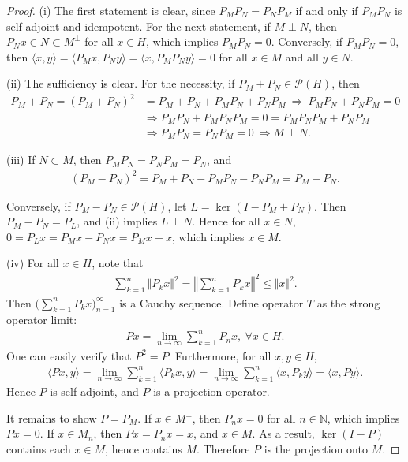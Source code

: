 \documentclass{article}
\begin{document}
\begin{proof}
(i) The first statement is clear, since $P_MP_N=P_NP_M$ if and only if $P_MP_N$ is self-adjoint and idempotent. For the next statement, if $M\perp N$, then $P_N x\in N\subset M^\perp$ for all $x\in H$, which implies $P_MP_N=0$. Conversely, if $P_MP_N=0$, then $\langle x,y\rangle= \langle P_M x,P_N y\rangle = \langle x, P_MP_N y\rangle = 0$ for all $x\in M$ and all $y\in N$.

(ii) The sufficiency is clear. For the necessity, if $P_M+P_N\in\mathcal{P}(H)$, then
\begin{align*}
	P_M+P_N=(P_M+P_N)^2 &= P_M + P_N + P_MP_N + P_NP_M\ \Rightarrow\ P_MP_N+P_NP_M=0\\
	&\Rightarrow P_MP_N + P_MP_NP_M = 0 = P_MP_NP_M+P_NP_M\\
	&\Rightarrow P_MP_N=P_NP_M=0\ \Rightarrow M\perp N.
\end{align*} 

(iii) If $N\subset M$, then $P_MP_N=P_NP_M = P_N$, and
\begin{align*}
	(P_M-P_N)^2 = P_M + P_N - P_MP_N - P_NP_M = P_M-P_N.
\end{align*}

Conversely, if $P_M-P_N\in\mathcal{P}(H)$, let $L=\ker(I-P_M+P_N)$. Then $P_M-P_N=P_L$, and (ii) implies $L\perp N$. Hence for all $x\in N$, $0=P_L x= P_Mx-P_N x = P_M x - x$, which implies $x\in M$.

(iv) For all $x\in H$, note that
\begin{align*}
	\sum_{k=1}^n\Vert P_k x\Vert^2 = \left\Vert\sum_{k=1}^n P_k x\right\Vert^2 \leq\Vert x\Vert^2.
\end{align*}
Then $\bigl(\sum_{k=1}^n P_k x\bigr)_{n=1}^\infty$ is a Cauchy sequence. Define operator $T$ as the strong operator limit:
\begin{align*}
	 Px=\lim_{n\to\infty}\sum_{k=1}^n P_n x,\ \forall x\in H.
\end{align*}
One can easily verify that $P^2=P$. Furthermore, for all $x,y\in H$,
\begin{align*}
	\langle Px,y\rangle = \lim_{n\to\infty}\sum_{k=1}^n \langle P_k x,y\rangle = \lim_{n\to\infty}\sum_{k=1}^n \langle x,P_k y\rangle = \langle x,Py\rangle.
\end{align*}
Hence $P$ is self-adjoint, and $P$ is a projection operator. 

It remains to show $P=P_M$. If $x\in M^\perp$, then $P_nx=0$ for all $n\in\mathbb{N}$, which implies $Px=0$. If $x\in M_n$, then $Px=P_n x=x$, and $x\in M$. As a result, $\ker(I-P)$ contains each $x\in M$, hence contains $M$. Therefore $P$ is the projection onto $M$.
\end{proof}
\end{document}
